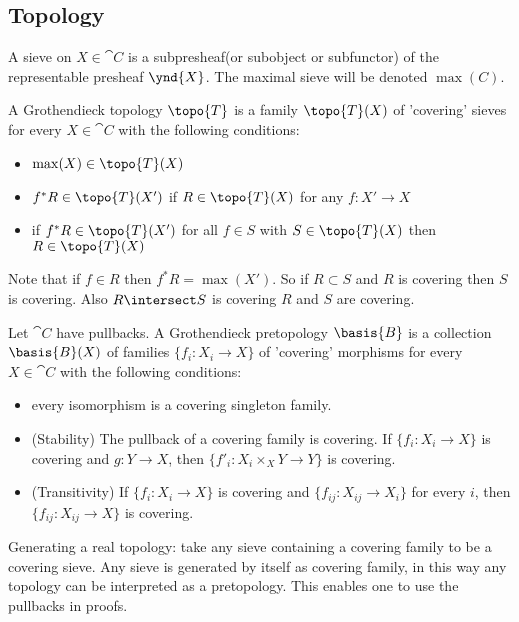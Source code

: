 \subsection{Topology}

\begin{definition}[Sieve]
A sieve on $X\in \cat{C}$ is a subpresheaf(or subobject or subfunctor) of the representable presheaf $\ynd{X}$. 
The maximal sieve will be denoted $\max(C)$.
\end{definition}


\begin{definition}
A Grothendieck topology $\topo{T}$ is a family $\topo{T}(X)$ of 'covering' sieves for every $X\in \cat{C}$ with the following conditions:
\begin{itemize}
\item  $\max(X) \in \topo{T}(X)$
\item $f^*R\in \topo{T}(X')$ if $R\in \topo{T}(X)$ for any $f:X'\rightarrow X$
\item if $f^*R\in \topo{T}(X')$ for all $f\in S$ with $S\in \topo{T}(X)$ then $R\in \topo{T}(X)$
\end{itemize}
Note that if $f\in R$ then $f^*R=\max(X')$. So if $R\subset S$ and $R$ is covering then $S$ is covering. 
Also $R\intersect S$ is covering \iff $R$ and $S$ are covering.
\end{definition}

\begin{definition}[Basis]
Let $\cat{C}$ have pullbacks.
A Grothendieck pretopology $\basis{B}$ is a collection $\basis{B}(X)$ of families $\{f_i:X_i\rightarrow X\}$ of 'covering' morphisms for every $X\in \cat{C}$ with the following conditions:
\begin{itemize}
\item  every isomorphism is a covering singleton family.
\item (Stability) The pullback of a covering family is covering. 
If  $\{f_i:X_i\rightarrow X\}$ is covering and $g:Y\rightarrow X$, then $\{f'_i:X_i\times_X Y\rightarrow Y\}$ is covering.
\item (Transitivity) If $\{f_i:X_i\rightarrow X\}$ is covering and $\{f_{ij}:X_{ij}\rightarrow X_i\}$ for every $i$, then $\{f_{ij}:X_{ij}\rightarrow X\}$ is covering.
\end{itemize}

Generating a real topology: take any sieve containing a covering family to be a covering sieve.
Any sieve is generated by itself as covering family, in this way any topology can be interpreted as a pretopology. This enables one to use the pullbacks in proofs.
\end{definition}

